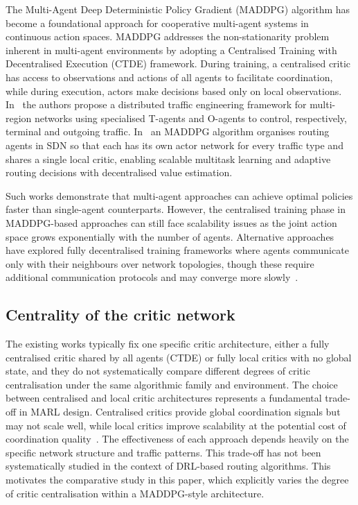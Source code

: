 \documentclass[10pt,journal,comsoc]{IEEEtran}
\begin{document}
The Multi-Agent Deep Deterministic Policy Gradient (MADDPG) algorithm has become a foundational approach for cooperative multi-agent systems in continuous action spaces. MADDPG addresses the non-stationarity problem inherent in multi-agent environments by adopting a Centralised Training with Decentralised Execution (CTDE) framework. During training, a centralised critic has access to observations and actions of all agents to facilitate coordination, while during execution, actors make decisions based only on local observations. In~\cite{geng2020multi} the authors propose a distributed traffic engineering framework for multi-region networks using specialised T-agents and O-agents to control, respectively, terminal and outgoing traffic. In~\cite{tong2023intelligent} an MADDPG algorithm organises routing agents in SDN so that each has its own actor network for every traffic type and shares a single local critic, enabling scalable multitask learning and adaptive routing decisions with decentralised value estimation.

Such works demonstrate that multi-agent approaches can achieve optimal policies faster than single-agent counterparts. However, the centralised training phase in MADDPG-based approaches can still face scalability issues as the joint action space grows exponentially with the number of agents. Alternative approaches have explored fully decentralised training frameworks where agents communicate only with their neighbours over network topologies, though these require additional communication protocols and may converge more slowly~\cite{feriani2021single,wang2024scheduling,li2022applications,zhao2020improving,kuang2025rs}.

\subsection{Centrality of the critic network}
The existing works typically fix one specific critic architecture, either a fully centralised critic shared by all agents (CTDE) or fully local critics with no global state, and they do not systematically compare different degrees of critic centralisation under the same algorithmic family and environment. The choice between centralised and local critic architectures represents a fundamental trade-off in MARL design. Centralised critics provide global coordination signals but may not scale well, while local critics improve scalability at the potential cost of coordination quality~\cite{lyu2023centralized,lyu2021contrasting}. The effectiveness of each approach depends heavily on the specific network structure and traffic patterns. This trade-off has not been systematically studied in the context of DRL-based routing algorithms. This motivates the comparative study in this paper, which explicitly varies the degree of critic centralisation within a MADDPG-style architecture.
\end{document}
